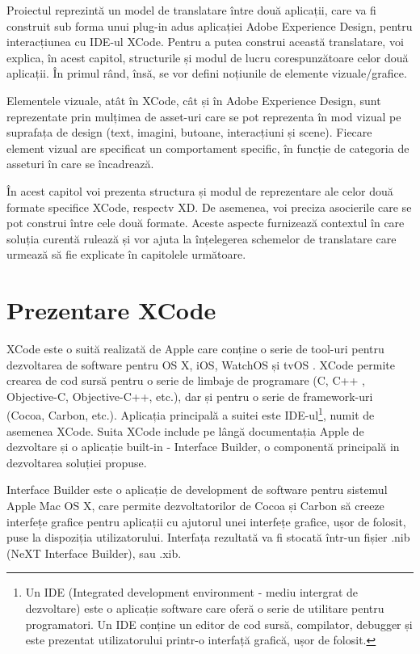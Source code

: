 Proiectul reprezintă un model de translatare între două aplicații, care va fi construit sub forma unui plug-in adus aplicației Adobe Experience Design, pentru interacțiunea cu IDE-ul XCode. 
Pentru a putea construi această translatare, voi explica, în acest capitol, structurile și modul de lucru corespunzătoare celor două aplicații. În primul rând, însă, se vor defini noțiunile de elemente vizuale/grafice.

Elementele vizuale, atât în XCode, cât și în Adobe Experience Design, sunt reprezentate prin mulțimea de asset-uri care se pot reprezenta în mod vizual pe suprafața de design (text, imagini, butoane, interacțiuni și scene). Fiecare element vizual are specificat un comportament specific, în funcție de categoria de asseturi în care se încadrează.

În acest capitol voi prezenta structura și modul de reprezentare ale celor două formate specifice XCode, respectv XD. De asemenea, voi preciza asocierile care se pot construi între cele două formate. Aceste aspecte furnizează contextul în care soluția curentă rulează și vor ajuta la înțelegerea schemelor de translatare care urmează să fie explicate în capitolele următoare.

\section{Prezentare XCode}

XCode este o suită realizată de Apple care conține o serie de tool-uri pentru dezvoltarea de software pentru OS X, iOS, WatchOS și tvOS \cite{Aboutxcode}. XCode permite crearea de cod sursă pentru o serie de limbaje de programare (C, C++ , Objective-C, Objective-C++, etc.), dar și pentru o serie de framework-uri (Cocoa, Carbon, etc.). Aplicația principală a suitei este IDE-ul\footnote{Un IDE (Integrated development environment - mediu intergrat de dezvoltare) este o aplicație software care oferă o serie de utilitare pentru programatori. Un IDE conține un editor de cod sursă, compilator, debugger și este prezentat utilizatorului printr-o interfață grafică, ușor de folosit.}, numit de asemenea XCode. Suita XCode include pe lângă documentația Apple de dezvoltare și o aplicație built-in - Interface Builder, o componentă principală in dezvoltarea soluției propuse.

Interface Builder este o aplicație de development de software pentru sistemul Apple Mac OS X, care permite dezvoltatorilor de Cocoa și Carbon să creeze interfețe grafice pentru aplicații cu ajutorul unei interfețe grafice, ușor de folosit, puse la dispoziția utilizatorului. Interfața rezultată va fi stocată într-un fișier .nib (NeXT Interface Builder), sau .xib.

